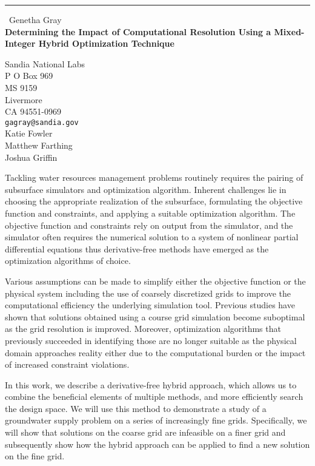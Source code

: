 \documentclass{report}
\begin{document}
\begin{center}
\rule{6in}{1pt} \
{\large Genetha Gray \\
{\bf Determining the Impact of Computational Resolution Using a Mixed-Integer Hybrid Optimization Technique }}

Sandia National Labs \\ P O Box 969 \\ MS 9159 \\ Livermore \\ CA 94551-0969
\\
{\tt gagray@sandia.gov}\\
Katie Fowler\\
Matthew Farthing\\
Joshua Griffin\end{center}

Tackling water resources management problems routinely requires the
pairing of subsurface simulators and optimization algorithm. Inherent
challenges lie in choosing the appropriate realization of the subsurface,
formulating the objective function and constraints, and applying a
suitable optimization algorithm. The objective function and constraints
rely on output from the simulator, and the simulator often requires the
numerical solution to a system of nonlinear partial differential
equations thus derivative-free methods have emerged as the optimization
algorithms of choice.

Various assumptions can be made to simplify either the objective function
or the physical system including the use of coarsely discretized grids to
improve the computational efficiency the underlying simulation tool.
Previous studies have shown that solutions obtained using a course grid
simulation become suboptimal as the grid resolution is improved.
Moreover, optimization algorithms that previously succeeded in
identifying those are no longer suitable as the physical domain
approaches reality either due to the computational burden or the impact
of increased constraint violations.

In this work, we describe a derivative-free hybrid approach, which allows
us to combine the beneficial elements of multiple methods, and more
efficiently search the design space. We will use this method to
demonstrate a study of a groundwater supply problem on a series of
increasingly fine grids. Specifically, we will show that solutions on the
coarse grid are infeasible on a finer grid and subsequently show how the
hybrid approach can be applied to find a new solution on the fine grid.
\end{document}
